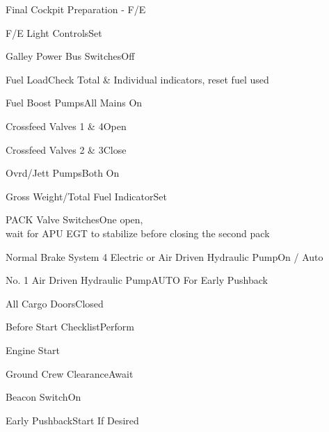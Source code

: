\documentclass[sim-use, blue_items]{checklist}
\begin{document}
\begin{checklist}{Final Cockpit Preparation - F/E}
	\item{F/E Light Controls}{Set}
	\item{Galley Power Bus Switches}{Off}
	\item{Fuel Load}{Check Total \& Individual indicators, reset fuel used}
	\item{Fuel Boost Pumps}{All Mains On}
	\item{Crossfeed Valves 1 \& 4}{Open}
	\item{Crossfeed Valves 2 \& 3}{Close}
	 {
		\item{Ovrd/Jett Pumps}{Both On}
	}
	\item{Gross Weight/Total Fuel Indicator}{Set}
	\item{PACK Valve Switches}{One open,\\wait for APU EGT to stabilize before closing the second pack}
	 {
		\item{Normal Brake System 4 Electric or Air Driven Hydraulic Pump}{On / Auto}
		\item{No. 1 Air Driven Hydraulic Pump}{AUTO For Early Pushback}
	}
	\item{All Cargo Doors}{Closed}
	\item{Before Start Checklist}{Perform}
\end{checklist}


\begin{checklist}{Engine Start}
	\item{Ground Crew Clearance}{Await}
	\item{Beacon Switch}{On}
	\item{Early Pushback}{Start If Desired}
\end{checklist}
\end{document}

